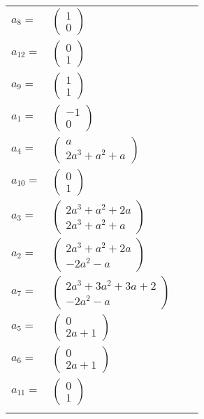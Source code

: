 \documentclass[1p]{elsarticle_modified}
\theoremstyle{definition}
\begin{document}
\begin{tabular}{m{7pt} m{180pt} m{7pt} m{180pt} }
\flushright $a_{8}=$&$\begin{pmatrix}1\\0\end{pmatrix}$ \\
\flushright $a_{12}=$&$\begin{pmatrix}0\\1\end{pmatrix}$ \\
\flushright $a_{9}=$&$\begin{pmatrix}1\\1\end{pmatrix}$ \\
\flushright $a_{1}=$&$\begin{pmatrix}-1\\0\end{pmatrix}$ \\
\flushright $a_{4}=$&$\begin{pmatrix}a\\2 a^3+a^2+a\end{pmatrix}$ \\
\flushright $a_{10}=$&$\begin{pmatrix}0\\1\end{pmatrix}$ \\
\flushright $a_{3}=$&$\begin{pmatrix}2 a^3+a^2+2 a\\2 a^3+a^2+a\end{pmatrix}$ \\
\flushright $a_{2}=$&$\begin{pmatrix}2 a^3+a^2+2 a\\-2 a^2- a\end{pmatrix}$ \\
\flushright $a_{7}=$&$\begin{pmatrix}2 a^3+3 a^2+3 a+2\\-2 a^2- a\end{pmatrix}$ \\
\flushright $a_{5}=$&$\begin{pmatrix}0\\2 a+1\end{pmatrix}$ \\
\flushright $a_{6}=$&$\begin{pmatrix}0\\2 a+1\end{pmatrix}$ \\
\flushright $a_{11}=$&$\begin{pmatrix}0\\1\end{pmatrix}$\\&\end{tabular}
\end{document}

